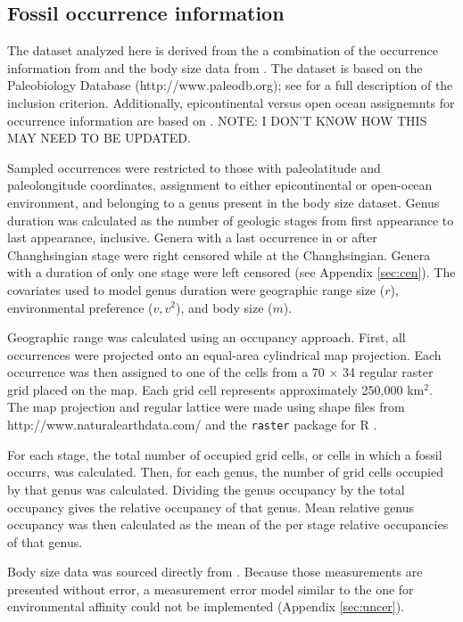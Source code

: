 \documentclass[12pt,letterpaper]{article}
\begin{document}
\subsection{Fossil occurrence information}

The dataset analyzed here is derived from the a combination of the occurrence information from \citet{Foote2013} and the body size data from \citet{Payne2014}. The \citet{Foote2013} dataset is based on the Paleobiology Database (http://www.paleodb.org); see \citet{Foote2013} for a full description of the inclusion criterion. Additionally, epicontinental versus open ocean assignemnts for occurrence information are based on \citet{Miller2009a}. \uppercase{note: I don't know how this may need to be updated.}

Sampled occurrences were restricted to those with paleolatitude and paleolongitude coordinates, assignment to either epicontinental or open-ocean environment, and belonging to a genus present in the body size dataset. Genus duration was calculated as the number of geologic stages from first appearance to last appearance, inclusive. Genera with a last occurrence in or after Changhsingian stage were right censored while at the Changhsingian. Genera with a duration of only one stage were left censored (see Appendix \ref{sec:cen}). The covariates used to model genus duration were geographic range size (\(r\)), environmental preference (\(v, v^{2}\)), and body size (\(m\)). 

Geographic range was calculated using an occupancy approach. First, all occurrences were projected onto an equal-area cylindrical map projection. Each occurrence was then assigned to one of the cells from a 70 \(\times\) 34 regular raster grid placed on the map. Each grid cell represents approximately 250,000 km\(^{2}\). The map projection and regular lattice were made using shape files from http://www.naturalearthdata.com/ and the \texttt{raster} package for R \citep{raster}.

For each stage, the total number of occupied grid cells, or cells in which a fossil occurrs, was calculated. Then, for each genus, the number of grid cells occupied by that genus was calculated. Dividing the genus occupancy by the total occupancy gives the relative occupancy of that genus. Mean relative genus occupancy was then calculated as the mean of the per stage relative occupancies of that genus. 

Body size data was sourced directly from \citet{Payne2014}. Because those measurements are presented without error, a measurement error model similar to the one for environmental affinity could not be implemented (Appendix \ref{sec:uncer}).
\end{document}
